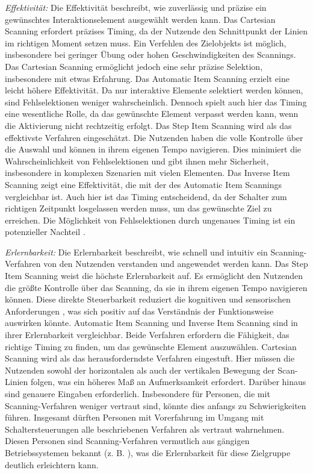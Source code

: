 \textit{Effektivität:}
Die Effektivität beschreibt, wie zuverlässig und präzise ein gewünschtes Interaktionselement ausgewählt werden kann. Das Cartesian Scanning erfordert präzises Timing, da der Nutzende den Schnittpunkt der Linien im richtigen Moment setzen muss. Ein Verfehlen des Zielobjekts ist möglich, insbesondere bei geringer Übung oder hohen Geschwindigkeiten des Scannings. Das Cartesian Scanning ermöglicht jedoch eine sehr präzise Selektion, insbesondere mit etwas Erfahrung. 
Das Automatic Item Scanning erzielt eine leicht höhere Effektivität. Da nur interaktive Elemente selektiert werden können, sind Fehlselektionen weniger wahrscheinlich. Dennoch spielt auch hier das Timing eine wesentliche Rolle, da das gewünschte Element verpasst werden kann, wenn die Aktivierung nicht rechtzeitig erfolgt. Das Step Item Scanning wird als das effektivste Verfahren eingeschätzt. Die Nutzenden haben die volle Kontrolle über die Auswahl und können in ihrem eigenen Tempo navigieren. Dies minimiert die Wahrscheinlichkeit von Fehlselektionen und gibt ihnen mehr Sicherheit, insbesondere in komplexen Szenarien mit vielen Elementen. Das Inverse Item Scanning zeigt eine Effektivität, die mit der des Automatic Item Scannings vergleichbar ist. Auch hier ist das Timing entscheidend, da der Schalter zum richtigen Zeitpunkt losgelassen werden muss, um das gewünschte Ziel zu erreichen. Die Möglichkeit von Fehlselektionen durch ungenaues Timing ist ein potenzieller Nachteil \citep{COOK2015117}.

\textit{Erlernbarkeit:}
Die Erlernbarkeit beschreibt, wie schnell und intuitiv ein Scanning-Verfahren von den Nutzenden verstanden und angewendet werden kann. Das Step Item Scanning weist die höchste Erlernbarkeit auf. Es ermöglicht den Nutzenden die größte Kontrolle über das Scanning, da sie in ihrem eigenen Tempo navigieren können. Diese direkte Steuerbarkeit reduziert die kognitiven und sensorischen Anforderungen \citep{COOK2015117}, was sich positiv auf das Verständnis der Funktionsweise auswirken könnte. Automatic Item Scanning und Inverse Item Scanning sind in ihrer Erlernbarkeit vergleichbar. Beide Verfahren erfordern die Fähigkeit, das richtige Timing zu finden, um das gewünschte Element auszuwählen. Cartesian Scanning wird als das herausforderndste Verfahren eingestuft. Hier müssen die Nutzenden sowohl der horizontalen als auch der vertikalen Bewegung der Scan-Linien folgen, was ein höheres Maß an Aufmerksamkeit erfordert. Darüber hinaus sind genauere Eingaben erforderlich. Insbesondere für Personen, die mit Scanning-Verfahren weniger vertraut sind, könnte dies anfangs zu Schwierigkeiten führen.
Insgesamt dürften Personen mit Vorerfahrung im Umgang mit Schaltersteuerungen alle beschriebenen Verfahren als vertraut wahrnehmen. Diesen Personen sind Scanning-Verfahren vermutlich aus gängigen Betriebssystemen bekannt (z. B. \citep{apple_einfuhrung_2024-2, Google-Switch-Access}), was die Erlernbarkeit für diese Zielgruppe deutlich erleichtern kann.

